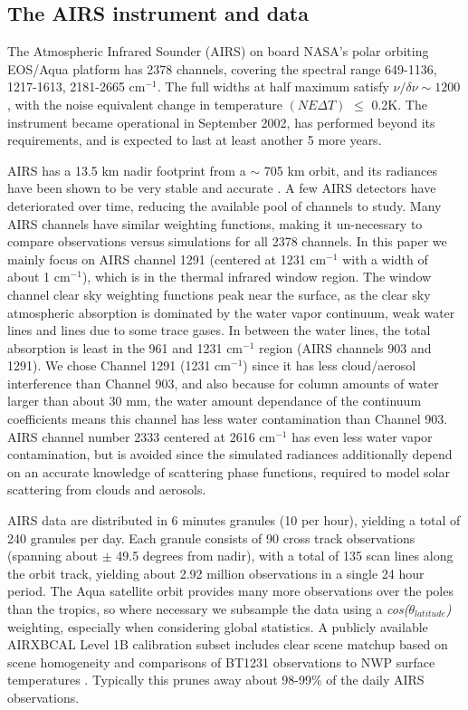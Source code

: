 \documentclass[agupp]{aguplus}              %
\newcommand{\wn}{cm$^{-1}$\xspace}
\begin{document}
\begin{article}
\subsection{The AIRS instrument and data} The Atmospheric Infrared
Sounder (AIRS) on board NASA's polar orbiting EOS/Aqua platform has
2378 channels, covering the spectral range 649-1136, 1217-1613,
2181-2665 \wn. The full widths at half maximum satisfy $\nu/\delta\nu
\sim 1200$, with the noise equivalent change in temperature $(NE
\Delta T)$ $\le$ 0.2K.  The instrument became operational in September
2002, has performed beyond its requirements, and is expected to last
at least another 5 more years.  

AIRS has a 13.5 km nadir footprint from a $\sim$ 705 km orbit, and its
radiances have been shown to be very stable and accurate
\citep{aum:06}. A few AIRS detectors have deteriorated over time,
reducing the available pool of channels to study. Many AIRS channels
have similar weighting functions, making it un-necessary to compare
observations versus simulations for all 2378 channels. In this paper
we mainly focus on AIRS channel 1291 (centered at 1231 \wn with a
width of about 1 \wn), which is in the thermal infrared window
region. The window channel clear sky weighting
functions peak near the surface, as the clear sky atmospheric
absorption is dominated by the water vapor continuum, weak water lines
and lines due to some trace gases. In between the water lines, the
total absorption is least in the 961 and 1231 \wn region (AIRS
channels 903 and 1291). We chose Channel 1291 (1231 \wn) since it has
less cloud/aerosol interference than Channel 903, and also because for
column amounts of water larger than about 30 mm, the water amount
dependance of the continuum coefficients means this channel has less
water contamination than Channel 903.  AIRS channel number 2333
centered at 2616 \wn has even less water vapor contamination, but is
avoided since the simulated radiances additionally depend on an
accurate knowledge of scattering phase functions, required to model
solar scattering from clouds and aerosols.

AIRS data are distributed in 6 minutes granules (10 per hour),
yielding a total of 240 granules per day. Each granule consists of 90
cross track observations (spanning about $\pm$ 49.5 degrees from nadir),
with a total of 135 scan lines along the orbit track, yielding about
2.92 million observations in a single 24 hour period. The Aqua
satellite orbit provides many more observations over the poles than
the tropics, so where necessary we subsample the data using a
\emph{cos($\theta_{latitude}$)} weighting, especially when considering
global statistics. A publicly available AIRXBCAL Level 1B
calibration subset includes clear scene matchup based on scene
homogeneity and comparisons of BT1231 observations to NWP surface
temperatures \citep{aum:07}. Typically this prunes away about 98-99\%
of the daily AIRS observations.


\end{article}
\end{document}
